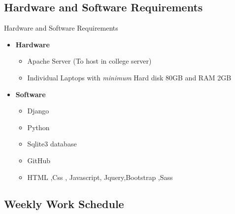 \documentclass{beamer}
\begin{document}
\subsection{Hardware and Software Requirements}
\begin{frame}{Hardware and Software Requirements}
\begin{itemize}
\item \textbf{Hardware}
	\begin{itemize}
	\item Apache Server (To host in college server)
    \item Individual Laptops with \textit{minimum} Hard disk 80GB and RAM 2GB
	\end{itemize}
\item \textbf{Software} 
	\begin{itemize}
	\item Django
	\item Python
    \item Sqlite3 database
	\item GitHub
	\item HTML ,Css , Javascript, Jquery,Bootstrap ,Sass
	\end{itemize}
\end{itemize}
\end{frame}

\subsection{Weekly Work Schedule}
\begin{frame}{Weekly Work Schedule}

\begin{figure}
\texttt{[image: table.png]}
\caption{\label{fig:Schedule}
\end{figure}

\end{frame}
\end{document}
